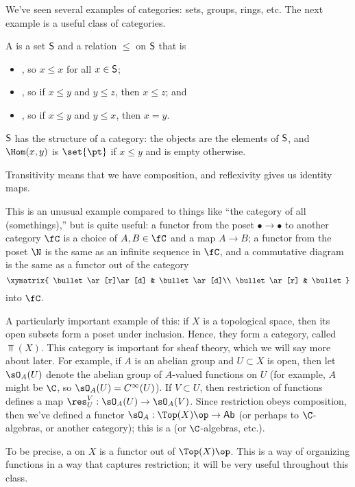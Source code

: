 We've seen several examples of categories: sets, groups, rings, etc. The next example is a useful class of
categories.
\begin{defn}
A  is a set \(\mathsf S\) and a relation \(\le\) on \(\mathsf S\) that is
\begin{itemize}
	\item {}, so \(x\le x\) for all \(x\in\mathsf S\);
	\item {}, so if \(x\le y\) and \(y\le z\), then \(x\le z\); and
	\item {}, so if \(x\le y\) and \(y\le x\), then \(x = y\).
\end{itemize}
\(\mathsf S\) has the structure of a category: the objects are the elements of \(\mathsf S\), and \(\Hom(x,y)\) is
\(\set{\pt}\) if \(x\le y\) and is empty otherwise.
\end{defn}
Transitivity means that we have composition, and reflexivity gives us identity maps.

This is an unusual example compared to things like ``the category of all (somethings),'' but is quite useful: a
functor from the poset \(\bullet\to\bullet\) to another category \(\fC\) is a choice of \(A,B\in\fC\) and a map
\(A\to B\); a functor from the poset \(\N\) is the same as an infinite sequence in \(\fC\), and a commutative
diagram is the same as a functor out of the category
\[\xymatrix{
	\bullet\ar[r]\ar[d] & \bullet\ar[d]\\
	\bullet\ar[r] & \bullet
}\]
into \(\fC\).
\begin{exm}
A particularly important example of this: if \(X\) is a topological space, then its open subsets form a poset under
inclusion. Hence, they form a category, called \(\Top(X)\). This category is important for sheaf theory, which we
will say more about later. For example, if \(A\) is an abelian group and \(U\subset X\) is open, then let
\(\sO_A(U)\) denote the abelian group of \(A\)-valued functions on \(U\) (for example, \(A\) might be \(\C\), so
\(\sO_A(U) = C^\infty(U)\)). If \(V\subset U\), then restriction of functions defines a map \(\res_U^V:
\sO_A(U)\to\sO_A(V)\). Since restriction obeys composition, then we've defined a functor \(\sO_A:
\Top(X)\op\to\mathsf{Ab}\) (or perhaps to \(\C\)-algebras, or another category); this is a  (or \(\C\)-algebras, etc.).
\end{exm}
To be precise, a  on \(X\) is a functor out of \(\Top(X)\op\). This is a way of organizing functions
in a way that captures restriction; it will be very useful throughout this class.

